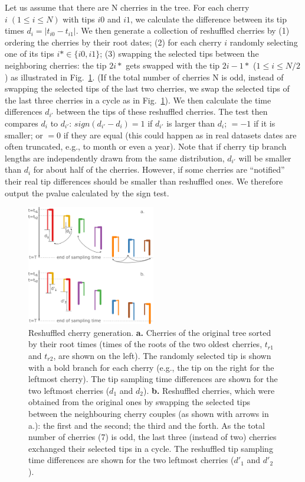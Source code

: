 \documentclass[10pt,letterpaper]{article}
\begin{document}
Let us assume that there are N cherries in the tree. For each cherry $i\;(1 \leq i \leq N)$ with tips $i0$ and $i1$, we calculate the difference between its tip times $d_i = |t_{i0} - t_{i1}|$. We then generate a collection of reshuffled cherries by (1) ordering the cherries by their root dates; (2) for each cherry $i$ randomly selecting one of its tips $i* \in \{i0, i1\}$; (3) swapping the selected tips between the neighboring cherries: the tip $2i*$ gets swapped with the tip $2i-1*$ ($1 \leq i \leq N / 2$) as illustrated in Fig.~\ref{fig:tipswap}. (If the total number of cherries N is odd, instead of swapping the selected tips of the last two cherries, we swap the selected tips of the last three cherries in a cycle as in Fig.~\ref{fig:tipswap}). We then calculate the time differences $d_{i'}$ between the tips of these reshuffled cherries. 
The test then compares $d_i$ to $d_{i'}$: $sign(d_{i'} - d_i) = 1$ if $d_{i'}$ is larger than $d_i$; $= -1$ if it is smaller; or $= 0$ if they are equal (this could happen as in real datasets dates are often truncated, e.g., to month or even a year). Note that if cherry tip branch lengths are independently drawn from the same distribution, $d_{i'}$ will be smaller than $d_i$ for about half of the cherries. However, if some cherries are ``notified'' their real tip differences should be smaller than reshuffled ones. We therefore output the pvalue calculated by the sign test.


\begin{figure}[tbhp]
\centering 
\includegraphics[width=0.5\textwidth]{Fig_cherryswap.png}
\caption{Reshuffled cherry generation. \textbf{a.} Cherries of the original tree sorted by their root times (times of the roots of the two oldest cherries, $t_{r1}$ and $t_{r2}$, are shown on the left). The randomly selected tip is shown with a bold branch for each cherry (e.g., the tip on the right for the leftmost cherry). The tip sampling time differences are shown for the two leftmost cherries ($d_1$ and $d_2$). \textbf{b.} Reshuffled cherries, which were obtained from the original ones by swapping the selected tips between the neighbouring cherry couples (as shown with arrows in a.): the first and the second; the third and the forth. As the total number of cherries (7) is odd, the last three (instead of two) cherries exchanged their selected tips in a cycle. The reshuffled tip sampling time differences are shown for the two leftmost cherries ($d'_1$ and $d'_2$).}
\label{fig:tipswap} 
\end{figure}
\end{document}
